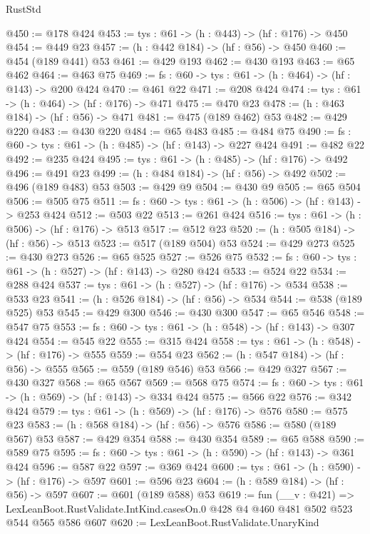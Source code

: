 \begin{lexlean}{RustStd}
\begin{coremodule}
{\begin{coremodule}
{{{{{{{{{{{{{{{{{{{{{{{{{{{@450 := @178 @424
@453 := {tys : @61} -> (h : @443) -> (hf : @176) -> @450
@454 := @449 @23
@457 := (h : @442 @184) -> (hf : @56) -> @450
@460 := @454 (@189 @441) @53
@461 := @429 @193
@462 := @430 @193
@463 := @65 @462
@464 := @463 @75
@469 := {fs : @60} -> {tys : @61} -> (h : @464) -> (hf : @143) -> @200 @424
@470 := @461 @22
@471 := @208 @424
@474 := {tys : @61} -> (h : @464) -> (hf : @176) -> @471
@475 := @470 @23
@478 := (h : @463 @184) -> (hf : @56) -> @471
@481 := @475 (@189 @462) @53
@482 := @429 @220
@483 := @430 @220
@484 := @65 @483
@485 := @484 @75
@490 := {fs : @60} -> {tys : @61} -> (h : @485) -> (hf : @143) -> @227 @424
@491 := @482 @22
@492 := @235 @424
@495 := {tys : @61} -> (h : @485) -> (hf : @176) -> @492
@496 := @491 @23
@499 := (h : @484 @184) -> (hf : @56) -> @492
@502 := @496 (@189 @483) @53
@503 := @429 @9
@504 := @430 @9
@505 := @65 @504
@506 := @505 @75
@511 := {fs : @60} -> {tys : @61} -> (h : @506) -> (hf : @143) -> @253 @424
@512 := @503 @22
@513 := @261 @424
@516 := {tys : @61} -> (h : @506) -> (hf : @176) -> @513
@517 := @512 @23
@520 := (h : @505 @184) -> (hf : @56) -> @513
@523 := @517 (@189 @504) @53
@524 := @429 @273
@525 := @430 @273
@526 := @65 @525
@527 := @526 @75
@532 := {fs : @60} -> {tys : @61} -> (h : @527) -> (hf : @143) -> @280 @424
@533 := @524 @22
@534 := @288 @424
@537 := {tys : @61} -> (h : @527) -> (hf : @176) -> @534
@538 := @533 @23
@541 := (h : @526 @184) -> (hf : @56) -> @534
@544 := @538 (@189 @525) @53
@545 := @429 @300
@546 := @430 @300
@547 := @65 @546
@548 := @547 @75
@553 := {fs : @60} -> {tys : @61} -> (h : @548) -> (hf : @143) -> @307 @424
@554 := @545 @22
@555 := @315 @424
@558 := {tys : @61} -> (h : @548) -> (hf : @176) -> @555
@559 := @554 @23
@562 := (h : @547 @184) -> (hf : @56) -> @555
@565 := @559 (@189 @546) @53
@566 := @429 @327
@567 := @430 @327
@568 := @65 @567
@569 := @568 @75
@574 := {fs : @60} -> {tys : @61} -> (h : @569) -> (hf : @143) -> @334 @424
@575 := @566 @22
@576 := @342 @424
@579 := {tys : @61} -> (h : @569) -> (hf : @176) -> @576
@580 := @575 @23
@583 := (h : @568 @184) -> (hf : @56) -> @576
@586 := @580 (@189 @567) @53
@587 := @429 @354
@588 := @430 @354
@589 := @65 @588
@590 := @589 @75
@595 := {fs : @60} -> {tys : @61} -> (h : @590) -> (hf : @143) -> @361 @424
@596 := @587 @22
@597 := @369 @424
@600 := {tys : @61} -> (h : @590) -> (hf : @176) -> @597
@601 := @596 @23
@604 := (h : @589 @184) -> (hf : @56) -> @597
@607 := @601 (@189 @588) @53
@619 := fun (__v : @421) =>
  LexLeanBoot.RustValidate.IntKind.casesOn.{0} @428 @4 @460 @481 @502 @523 @544 @565 @586 @607
@620 := LexLeanBoot.RustValidate.UnaryKind
}}}}}}}}}}}}}}}}}}}}}}}}}}}
\end{coremodule}}
\end{coremodule}
\end{lexlean}

